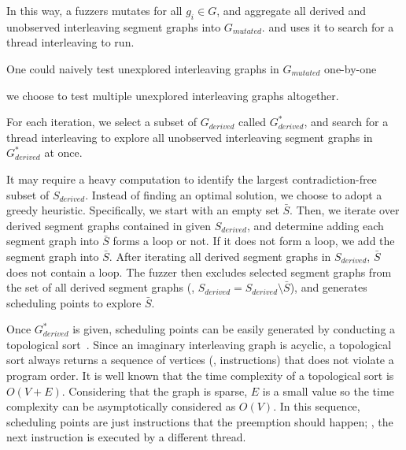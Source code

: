 In this way, a fuzzers mutates for all $g_i \in G$, and aggregate all
derived and unobserved interleaving segment graphs into
$G_{mutated}$. and uses it to search for a thread interleaving to run.







%
One could naively test unexplored interleaving graphs in $G_{mutated}$
one-by-one

we choose to test multiple unexplored interleaving graphs
altogether.



For each iteration, we select a subset of $G_{derived}$ called
$G^{*}_{derived}$, and search for a thread interleaving to explore all
unobserved interleaving segment graphs in $G^{*}_{derived}$ at once.




It may require a heavy computation to identify the largest
contradiction-free subset of $S_{derived}$.
%
Instead of finding an optimal solution, we choose to adopt a greedy
heuristic.
%
Specifically, we start with an empty set $\bar{S}$. Then, we iterate
over derived segment graphs contained in given $S_{derived}$, and
determine adding each segment graph into $\bar{S}$ forms a loop or
not. If it does not form a loop, we add the segment graph into
$\bar{S}$.
%
After iterating all derived segment graphs in $S_{derived}$, $\bar{S}$
does not contain a loop. The fuzzer then excludes selected segment
graphs from the set of all derived segment graphs (\ie,
$S_{derived} = S_{derived} \setminus \bar{S}$), and generates
scheduling points to explore $\bar{S}$.









%
Once $G^{*}_{derived}$ is given, scheduling points can be easily
generated by conducting a topological sort~\cite{topologicalsort}.
%
Since an imaginary interleaving graph is acyclic, a topological sort
always returns a sequence of vertices (\ie, instructions) that does
not violate a program order.
%
It is well known that the time complexity of a topological sort is
$O(V+E)$. Considering that the graph is sparse, $E$ is a small value
so the time complexity can be asymptotically considered as $O(V)$.
%
In this sequence, scheduling points are just instructions that the
preemption should happen; \ie, the next instruction is executed by a
different thread.




